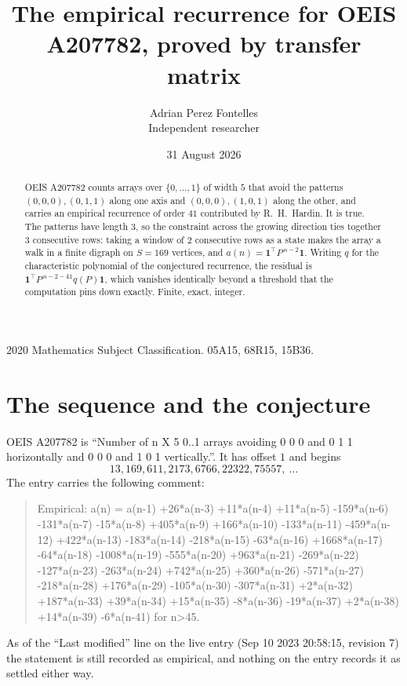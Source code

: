 \documentclass[11pt,a4paper]{article}
\title{The empirical recurrence for OEIS A207782, proved by transfer matrix}
\author{Adrian Perez Fontelles\\ \small Independent researcher}
\date{31 August 2026}
\theoremstyle{plain}
\theoremstyle{definition}
\begin{document}
\maketitle

\begin{abstract}
OEIS A207782 counts arrays over $\{0,\dots,1\}$ of width $5$ that avoid the patterns
$(0,0,0), (0,1,1)$ along one axis and $(0,0,0), (1,0,1)$ along the other, and carries an empirical recurrence of
order $41$ contributed by R.~H.~Hardin. It is true. The patterns have length $3$, so
the constraint across the growing direction ties together $3$ consecutive rows: taking a
window of $2$ consecutive rows as a state makes the array a walk in a finite digraph
on $S=169$ vertices, and $a(n)=\mathbf{1}^{\!\top}P^{\,n-2}\mathbf{1}$. Writing $q$
for the characteristic polynomial of the conjectured recurrence, the residual is
$\mathbf{1}^{\!\top}P^{\,n-2-41}q(P)\mathbf{1}$, which vanishes identically
beyond a threshold that the computation pins down exactly. Finite, exact, integer.
\end{abstract}

\noindent\small 2020 Mathematics Subject Classification. 05A15, 68R15, 15B36.\normalsize

\section{The sequence and the conjecture}

OEIS A207782 is ``Number of n X 5 0..1 arrays avoiding 0 0 0 and 0 1 1 horizontally and 0 0 0 and 1 0 1 vertically.''. It has offset
$1$ and begins
\[
13, 169, 611, 2173, 6766, 22322, 75557,\ \dots
\]
The entry carries the following comment:
\begin{quote}\small
Empirical: a(n) = a(n-1) +26*a(n-3) +11*a(n-4) +11*a(n-5) -159*a(n-6) -131*a(n-7) -15*a(n-8) +405*a(n-9) +166*a(n-10) -133*a(n-11) -459*a(n-12) +422*a(n-13) -183*a(n-14) -218*a(n-15) -63*a(n-16) +1668*a(n-17) -64*a(n-18) -1008*a(n-19) -555*a(n-20) +963*a(n-21) -269*a(n-22) -127*a(n-23) -263*a(n-24) +742*a(n-25) +360*a(n-26) -571*a(n-27) -218*a(n-28) +176*a(n-29) -105*a(n-30) -307*a(n-31) +2*a(n-32) +187*a(n-33) +39*a(n-34) +15*a(n-35) -8*a(n-36) -19*a(n-37) +2*a(n-38) +14*a(n-39) -6*a(n-41) for n>45.
\end{quote}
As of the ``Last modified'' line on the live entry (Sep 10 2023 20:58:15, revision
7) the statement is still recorded as empirical, and nothing on the entry
records it as settled either way.
\end{document}
